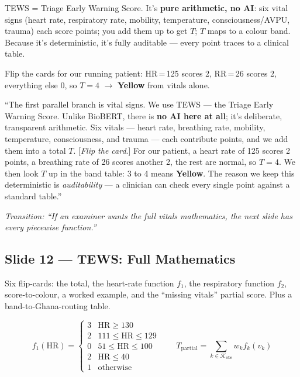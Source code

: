 \documentclass[11pt]{article}
\newcommand{\chip}[2]{\textcolor{#1}{\textbf{#2}}}
\newcommand{\transition}[1]{\medskip\noindent\textit{\textcolor{mutel}{Transition: #1}}\medskip}
\newcommand{\route}[1]{{\small\texttt{\textcolor{mutel}{#1}}}}
\newcommand{\slide}[3]{%
  \subsection{Slide #1 --- #2}%
  \noindent\route{Route: #3}\par\smallskip}
\begin{document}
\begin{idea}
TEWS = Triage Early Warning Score. It's \textbf{pure arithmetic, no AI}: six vital signs (heart rate,
respiratory rate, mobility, temperature, consciousness/AVPU, trauma) each score points; you add them up to
get $T$; $T$ maps to a colour band. Because it's deterministic, it's fully auditable --- every point
traces to a clinical table.
\end{idea}

\begin{demo}
Flip the cards for our running patient: HR\,=\,125 scores 2, RR\,=\,26 scores 2, everything else 0, so
$T=4$ $\rightarrow$ \chip{satYellow}{Yellow} from vitals alone.
\end{demo}

\begin{saybox}
``The first parallel branch is vital signs. We use TEWS --- the Triage Early Warning Score. Unlike
BioBERT, there is \textbf{no AI here at all}; it's deliberate, transparent arithmetic. Six vitals --- heart
rate, breathing rate, mobility, temperature, consciousness, and trauma --- each contribute points, and we
add them into a total $T$. [\emph{Flip the card}.] For our patient, a heart rate of 125 scores 2 points, a
breathing rate of 26 scores another 2, the rest are normal, so $T=4$. We then look $T$ up in the band
table: 3 to 4 means \chip{satYellow}{Yellow}. The reason we keep this deterministic is \emph{auditability}
--- a clinician can check every single point against a standard table.''
\end{saybox}

\transition{``If an examiner wants the full vitals mathematics, the next slide has every piecewise function.''}

\slide{12}{TEWS: Full Mathematics}{/dashboard/math/tews}

\begin{onscreen}
Six flip-cards: the total, the heart-rate function $f_1$, the respiratory function $f_2$,
score-to-colour, a worked example, and the ``missing vitals'' partial score. Plus a band-to-Ghana-routing
table.
\end{onscreen}

\[
f_1(\mathrm{HR})=\begin{cases}3 & \mathrm{HR}\ge130\\ 2 & 111\le \mathrm{HR}\le129\\ 0 & 51\le \mathrm{HR}\le100\\ 2 & \mathrm{HR}\le40\\ 1 & \text{otherwise}\end{cases}
\qquad
T_{\mathrm{partial}}=\!\!\sum_{k\in\mathcal{K}_{\mathrm{obs}}}\!\! w_k f_k(v_k)
\]
\end{document}
